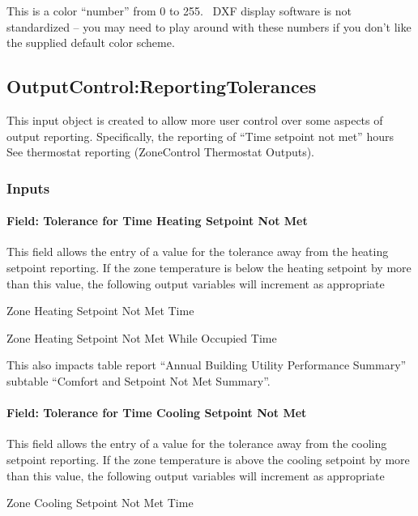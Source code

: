 This is a color ``number'' from 0 to 255.~ DXF display software is not standardized -- you may need to play around with these numbers if you don't like the supplied default color scheme.

\subsection{OutputControl:ReportingTolerances}\label{outputcontrolreportingtolerances}

This input object is created to allow more user control over some aspects of output reporting. Specifically, the reporting of ``Time setpoint not met'' hours~ See thermostat reporting (ZoneControl Thermostat Outputs).

\subsubsection{Inputs}\label{inputs-7-021}

\paragraph{Field: Tolerance for Time Heating Setpoint Not Met}\label{field-tolerance-for-time-heating-setpoint-not-met}

This field allows the entry of a value for the tolerance away from the heating setpoint reporting. If the zone temperature is below the heating setpoint by more than this value, the following output variables will increment as appropriate

Zone Heating Setpoint Not Met Time

Zone Heating Setpoint Not Met While Occupied Time

This also impacts table report ``Annual Building Utility Performance Summary'' subtable ``Comfort and Setpoint Not Met Summary''.

\paragraph{Field: Tolerance for Time Cooling Setpoint Not Met}\label{field-tolerance-for-time-cooling-setpoint-not-met}

This field allows the entry of a value for the tolerance away from the cooling setpoint reporting. If the zone temperature is above the cooling setpoint by more than this value, the following output variables will increment as appropriate

Zone Cooling Setpoint Not Met Time

